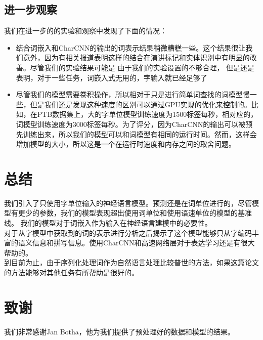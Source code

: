\subsection{进一步观察}
我们在进一步的的实验和观察中发现了下面的情况：
\begin{itemize}
\item 结合词嵌入和CharCNN的输出的词表示结果稍微糟糕一些。这个结果很让我们意外，因为有相关报道表明这样的结合在演讲标记和实体识别中有明显的改善。尽管我们的实验结果可能是 由于我们的实验设置的不够合理，
但是还是表明，对于一些任务，词嵌入式无用的，字输入就已经足够了
\item 尽管我们的模型需要卷积操作，所以相对于只是进行简单词查找的词模型慢一些，但是我们还是发现这种速度的区别可以通过GPU实现的优化来控制的。比如，在PTB数据集上，大的字单位模型训练速度为1500标签每秒，相对应的，
词模型训练速度为3000标签每秒。为了评分，因为CharCNN的输出可以被预先训练出来，所以我们的模型可以和词模型有相同的运行时间。然而，这样会增加模型的大小，所以这是一个在运行时速度和内存之间的取舍问题。
\end{itemize}
\section{总结}
我们引入了只使用字单位输入的神经语言模型。预测还是在词单位进行的，尽管模型有更少的参数，我们的模型表现超出使用词单位和使用语速单位的模型的基准线。
我们的模型对于词嵌入作为输入在神经语言建模中的必要性。\\
对于从字模型中获取到的词的表示进行分析之后揭示了这个模型能够只从字编码丰富的语义信息和拼写信息。使用CharCNN和高速网络层对于表达学习还是有很大帮助的。\\
到目前为止，由于序列化处理词作为自然语言处理比较普世的方法，如果这篇论文的方法能够对其他任务有所帮助是很好的。\\
\section{致谢}
我们非常感谢Jan Botha，他为我们提供了预处理好的数据和模型的结果。


